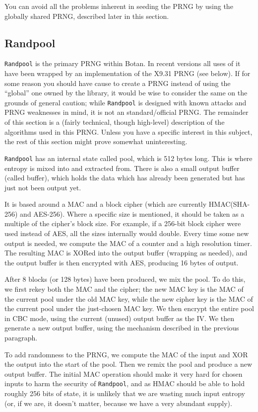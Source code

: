 \documentclass{article}
\newcommand{\type}[1]{\texttt{#1}}
\begin{document}
You can avoid all the problems inherent in seeding the PRNG by using the
globally shared PRNG, described later in this section.

\subsection{Randpool}

\type{Randpool} is the primary PRNG within Botan. In recent versions all uses
of it have been wrapped by an implementation of the X9.31 PRNG (see below). If
for some reason you should have cause to create a PRNG instead of using the
``global'' one owned by the library, it would be wise to consider the same on
the grounds of general caution; while \type{Randpool} is designed with known
attacks and PRNG weaknesses in mind, it is not an standard/official PRNG. The
remainder of this section is a (fairly technical, though high-level) description
of the algorithms used in this PRNG. Unless you have a specific interest in
this subject, the rest of this section might prove somewhat uninteresting.

\type{Randpool} has an internal state called pool, which is 512 bytes
long. This is where entropy is mixed into and extracted from. There is also a
small output buffer (called buffer), which holds the data which has already
been generated but has just not been output yet.

It is based around a MAC and a block cipher (which are currently HMAC(SHA-256)
and AES-256). Where a specific size is mentioned, it should be taken as a
multiple of the cipher's block size. For example, if a 256-bit block cipher
were used instead of AES, all the sizes internally would double. Every time
some new output is needed, we compute the MAC of a counter and a high
resolution timer. The resulting MAC is XORed into the output buffer (wrapping
as needed), and the output buffer is then encrypted with AES, producing 16
bytes of output.

After 8 blocks (or 128 bytes) have been produced, we mix the pool. To do this,
we first rekey both the MAC and the cipher; the new MAC key is the MAC of the
current pool under the old MAC key, while the new cipher key is the MAC of the
current pool under the just-chosen MAC key. We then encrypt the entire pool in
CBC mode, using the current (unused) output buffer as the IV. We then generate
a new output buffer, using the mechanism described in the previous paragraph.

To add randomness to the PRNG, we compute the MAC of the input and XOR the
output into the start of the pool. Then we remix the pool and produce a new
output buffer. The initial MAC operation should make it very hard for chosen
inputs to harm the security of \type{Randpool}, and as HMAC should be able to
hold roughly 256 bits of state, it is unlikely that we are wasting much input
entropy (or, if we are, it doesn't matter, because we have a very abundant
supply).
\end{document}
